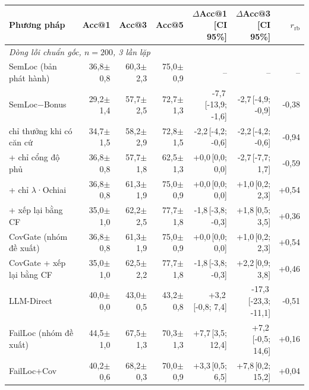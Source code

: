 \begin{tabular}{lrrrrrr}
\toprule
Phương pháp & Acc@1 & Acc@3 & Acc@5 & $\Delta$Acc@1 [CI 95\%] & $\Delta$Acc@3 [CI 95\%] & $r_{\text{rb}}$ \\
\midrule
\multicolumn{7}{l}{\emph{Dòng lỗi chuẩn gốc, $n=200$, 3 lần lặp}} \\
SemLoc (bản phát hành) & 36,8{\scriptsize$\pm$0,8} & 60,3{\scriptsize$\pm$2,3} & 75,0{\scriptsize$\pm$0,9} & -- & -- & -- \\
SemLoc−Bonus & 29,2{\scriptsize$\pm$1,4} & 57,7{\scriptsize$\pm$2,5} & 72,7{\scriptsize$\pm$1,3} & -7,7{\scriptsize\,[-13,9; -1,6]} & -2,7{\scriptsize\,[-4,9; -0,9]} & -0,38 \\
\quad chỉ thưởng khi có căn cứ & 34,7{\scriptsize$\pm$1,5} & 58,2{\scriptsize$\pm$2,9} & 72,8{\scriptsize$\pm$1,5} & -2,2{\scriptsize\,[-4,2; -0,6]} & -2,2{\scriptsize\,[-4,2; -0,6]} & -0,94 \\
\quad + chỉ cổng độ phủ & 36,8{\scriptsize$\pm$0,8} & 57,7{\scriptsize$\pm$1,8} & 62,5{\scriptsize$\pm$1,3} & +0,0{\scriptsize\,[0,0; 0,0]} & -2,7{\scriptsize\,[-7,7; 1,7]} & -0,59 \\
\quad + chỉ $\lambda$·Ochiai & 36,8{\scriptsize$\pm$0,8} & 61,3{\scriptsize$\pm$1,9} & 75,0{\scriptsize$\pm$0,9} & +0,0{\scriptsize\,[0,0; 0,0]} & +1,0{\scriptsize\,[0,2; 2,3]} & +0,54 \\
\quad + xếp lại bằng CF & 35,0{\scriptsize$\pm$1,0} & 62,2{\scriptsize$\pm$2,5} & 77,7{\scriptsize$\pm$1,8} & -1,8{\scriptsize\,[-3,8; -0,3]} & +1,8{\scriptsize\,[0,5; 3,5]} & +0,36 \\
CovGate (nhóm đề xuất) & 36,8{\scriptsize$\pm$0,8} & 61,3{\scriptsize$\pm$1,9} & 75,0{\scriptsize$\pm$0,9} & +0,0{\scriptsize\,[0,0; 0,0]} & +1,0{\scriptsize\,[0,2; 2,3]} & +0,54 \\
CovGate + xếp lại bằng CF & 35,0{\scriptsize$\pm$1,0} & 62,5{\scriptsize$\pm$2,2} & 77,7{\scriptsize$\pm$1,8} & -1,8{\scriptsize\,[-3,8; -0,3]} & +2,2{\scriptsize\,[0,9; 3,8]} & +0,46 \\
LLM-Direct & 40,0{\scriptsize$\pm$0,0} & 43,0{\scriptsize$\pm$0,5} & 43,2{\scriptsize$\pm$0,8} & +3,2{\scriptsize\,[-0,8; 7,4]} & -17,3{\scriptsize\,[-23,3; -11,1]} & -0,51 \\
FailLoc (nhóm đề xuất) & 44,5{\scriptsize$\pm$1,0} & 67,5{\scriptsize$\pm$1,3} & 70,3{\scriptsize$\pm$1,3} & +7,7{\scriptsize\,[3,5; 12,4]} & +7,2{\scriptsize\,[-0,5; 14,6]} & +0,16 \\
FailLoc+Cov & 40,2{\scriptsize$\pm$0,6} & 68,2{\scriptsize$\pm$0,3} & 70,0{\scriptsize$\pm$0,9} & +3,3{\scriptsize\,[0,5; 6,5]} & +7,8{\scriptsize\,[0,2; 15,2]} & +0,04 \\

\end{tabular}
